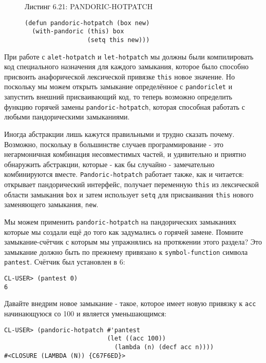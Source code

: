 \begin{figure}Листинг 6.21: PANDORIC-HOTPATCH\label{listing_6.21}
\listbegin
\begin{verbatim}
(defun pandoric-hotpatch (box new)
  (with-pandoric (this) box
                 (setq this new)))
\end{verbatim}
\listend
\end{figure}

При работе с \verb"alet-hotpatch" и \verb"let-hotpatch" мы должны были компилировать код специального назначения для каждого замыкания, которое было способно присвоить анафорической лексической привязке \verb"this" новое значение. Но поскольку мы можем открыть замыкание определённое с \verb"pandoriclet" и запустить внешний присваивающий код, то теперь возможно определить функцию горячей замены \verb"pandoric-hotpatch", которая способная работать с любыми пандорическими замыканиями.

Иногда абстракции лишь кажутся правильными и трудно сказать почему. Возможно, поскольку в большинстве случаев программирование - это негармоничная комбинация несовместимых частей, и удивительно и приятно обнаружить абстракции, которые - как бы случайно - замечательно комбинируются вместе. \verb"Pandoric-hotpatch" работает также, как и читается: открывает пандорический интерфейс, получает переменную \verb"this" из лексической области замыкания \verb"box" и затем использует \verb"setq" для присваивания \verb"this" нового заменяющего замыкания, \verb"new".

Мы можем применить \verb"pandoric-hotpatch" на пандорических замыканиях которые мы создали ещё до того как задумались о горячей замене. Помните замыкание-счётчик с которым мы упражнялись на протяжении этого раздела? Это замыкание должно быть по прежнему привязано к \verb"symbol-function" символа \verb"pantest". Счётчик был установлен в 6:

\begin{verbatim}
CL-USER> (pantest 0)
6
\end{verbatim}

Давайте внедрим новое замыкание - такое, которое имеет новую привязку к \verb"acc" начинающуюся со 100 и является уменьшающимся:

\begin{verbatim}
CL-USER> (pandoric-hotpatch #'pantest
                            (let ((acc 100))
                              (lambda (n) (decf acc n))))
#<CLOSURE (LAMBDA (N)) {C67F6ED}>
\end{verbatim}

